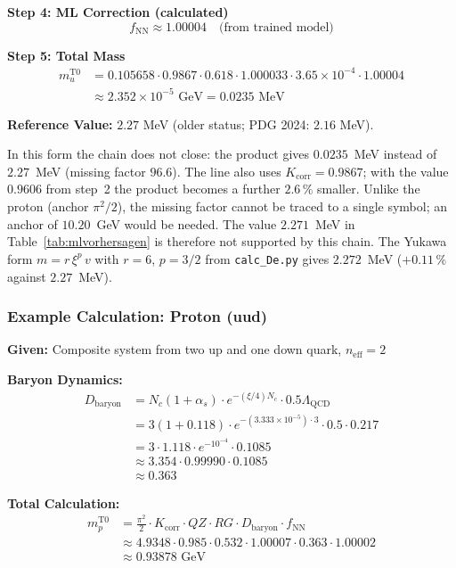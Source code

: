 	\textbf{Step 4: ML Correction (calculated)}
	\begin{equation}
		f_{\text{NN}} \approx 1.00004 \quad \text{(from trained model)}
	\end{equation}
	
	\textbf{Step 5: Total Mass}
	\begin{align}
		m_u^{\text{T0}} &= 0.105658 \cdot 0.9867 \cdot 0.618 \cdot 1.000033 \cdot 3.65 \times 10^{-4} \cdot 1.00004 \\
		&\approx 2.352 \times 10^{-5} \text{ GeV} = 0.0235 \text{ MeV}
	\end{align}

	\textbf{Reference Value:} $2.27$ MeV (older status; PDG 2024: $2.16$ MeV).

	In this form the chain does not close: the product gives $0.0235$~MeV instead of $2.27$~MeV (missing factor $96.6$). The line also uses $K_{\text{corr}} = 0.9867$; with the value $0.9606$ from step~2 the product becomes a further $2.6\,\%$ smaller. Unlike the proton (anchor $\pi^2/2$), the missing factor cannot be traced to a single symbol; an anchor of $10.20$~GeV would be needed. The value $2.271$~MeV in Table~\ref{tab:mlvorhersagen} is therefore not supported by this chain. The Yukawa form $m = r\,\xi^p\,v$ with $r = 6$, $p = 3/2$ from \texttt{calc\_De.py} gives $2.272$~MeV ($+0.11\,\%$ against $2.27$~MeV).
	
	\subsubsection{Example Calculation: Proton (uud)}
	
	\textbf{Given:} Composite system from two up and one down quark, $n_{\text{eff}}=2$
	
	\textbf{Baryon Dynamics:}
	\begin{align}
		D_{\text{baryon}} &= N_c (1 + \alpha_s) \cdot e^{-(\xi/4) N_c} \cdot 0.5 \Lambda_{\text{QCD}} \\
		&= 3 (1 + 0.118) \cdot e^{-(3.333 \times 10^{-5}) \cdot 3} \cdot 0.5 \cdot 0.217 \\
		&= 3 \cdot 1.118 \cdot e^{-10^{-4}} \cdot 0.1085 \\
		&\approx 3.354 \cdot 0.99990 \cdot 0.1085 \\
		&\approx 0.363
	\end{align}
	
	\textbf{Total Calculation:}
	\begin{align}
		m_p^{\text{T0}} &= \frac{\pi^2}{2} \cdot K_{\text{corr}} \cdot QZ \cdot RG \cdot D_{\text{baryon}} \cdot f_{\text{NN}} \\
		&\approx 4.9348 \cdot 0.985 \cdot 0.532 \cdot 1.00007 \cdot 0.363 \cdot 1.00002 \\
		&\approx 0.93878 \text{ GeV}
	\end{align}
	
